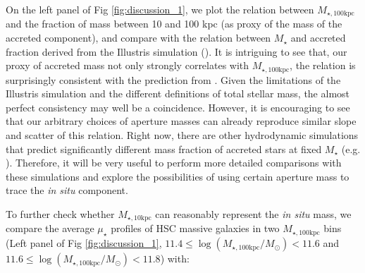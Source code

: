 \documentclass[a4paper,fleqn,usenatbib]{mnras}
\def\rbcg{\texttt{cenHighMh}}
\def\nbcg{\texttt{cenLowMh}}
\def\mstar{{$M_{\star}$}}
\def\mhalo{{$M_{\mathrm{halo}}$}}
\def\logms{{$\log (M_{\star}/M_{\odot})$}}
\def\minn{{$M_{\star,10\mathrm{kpc}}$}}
\def\mtot{{$M_{\star,100\mathrm{kpc}}$}}
\def\logmtot{{$\log (M_{\star,100\mathrm{kpc}}/M_{\odot})$}}
\def\mden{{$\mu_{\star}$}}
\begin{document}
    On the left panel of Fig \ref{fig:discussion_1}, we plot the relation between 
    \mtot{} and the fraction of mass between 10 and 100 kpc (as proxy of the mass of 
    the accreted component), and compare with the relation between \mstar{} and 
    accreted fraction derived from the Illustris simulation 
    (\citealt{RodriguezGomez2016}). 
    It is intriguing to see that, our proxy of accreted mass not only strongly 
    correlates with \mtot{}, the relation is surprisingly consistent with the 
    prediction from \citet{RodriguezGomez2016}. 
    Given the limitations of the Illustris simulation and the different definitions
    of total stellar mass, the almost perfect consistency may well be a coincidence. 
    However, it is encouraging to see that our arbitrary choices of aperture masses 
    can already reproduce similar slope and scatter of this relation. 
    Right now, there are other hydrodynamic simulations that predict significantly 
    different mass fraction of accreted stars at fixed \mstar{} (e.g. 
    \citealt{Lackner2012, Qu2017}). 
    Therefore, it will be very useful to perform more detailed comparisons with 
    these simulations and explore the possibilities of using certain aperture mass 
    to trace the \textit{in situ} component. 
    
   
    To further check whether \minn{} can reasonably represent the \textit{in situ} 
    mass, we compare the average \mden{} profiles of HSC massive galaxies in two 
    \mtot{} bins (Left panel of Fig \ref{fig:discussion_1}, 
    $11.4\leq$\logmtot{}$<11.6$ and $11.6\leq$\logmtot{}$<11.8$) with: 
    
\end{document}
